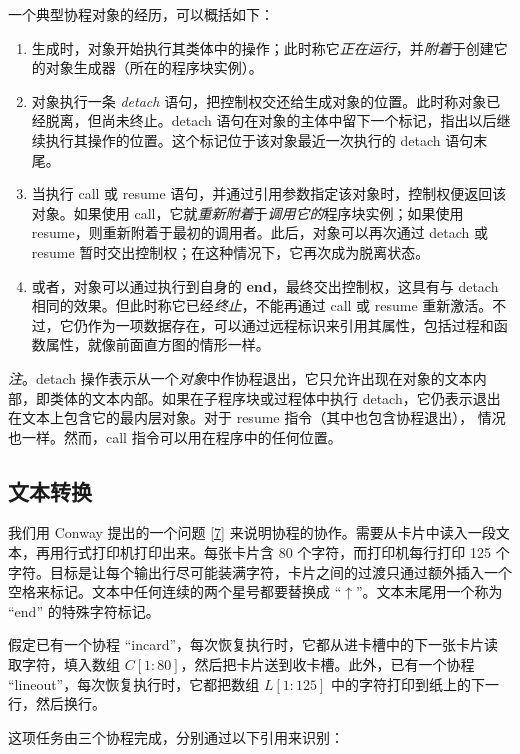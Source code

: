 \documentclass[twoside,11pt,fontset=none]{ctexbook}
\begin{document}
一个典型协程对象的经历，可以概括如下：

\begin{enumerate}[wide, nosep, label=(\arabic*)]
	\item 生成时，对象开始执行其类体中的操作；此时称它\textit{正在运行}，并\textit{附着}于创建它的对象生成器（所在的程序块实例）。
	\item 对象执行一条 \textit{detach} 语句，把控制权交还给生成对象的位置。此时称对象已经脱离，但尚未终止。detach 语句在对象的主体中留下一个标记，指出以后继续执行其操作的位置。这个标记位于该对象最近一次执行的 detach 语句末尾。
	\item 当执行 call 或 resume 语句，并通过引用参数指定该对象时，控制权便返回该对象。如果使用 call，它就\textit{重新附着}于\textit{调用它的}程序块实例；如果使用 resume，则重新附着于最初的调用者。此后，对象可以再次通过 detach 或 resume 暂时交出控制权；在这种情况下，它再次成为脱离状态。
	\item 或者，对象可以通过执行到自身的 \textbf{end}，最终交出控制权，这具有与 detach 相同的效果。但此时称它已经\textit{终止}，不能再通过 call 或 resume 重新激活。不过，它仍作为一项数据存在，可以通过远程标识来引用其属性，包括过程和函数属性，就像前面直方图的情形一样。
\end{enumerate}

\textit{注}。detach 操作表示从一个\textit{对象}中作协程退出，它只允许出现在对象的文本内部，即类体的文本内部。如果在子程序块或过程体中执行 detach，它仍表示退出在文本上包含它的最内层对象。对于 resume 指令（其中也包含协程退出），
情况也一样。然而，call 指令可以用在程序中的任何位置。

\subsection{文本转换}

我们用 Conway 提出的一个问题 [\hyperref[ref:7]{7}] 来说明协程的协作。需要从卡片中读入一段文本，再用行式打印机打印出来。每张卡片含 80 个字符，而打印机每行打印 125 个字符。目标是让每个输出行尽可能装满字符，卡片之间的过渡只通过额外插入一个空格来标记。文本中任何连续的两个星号都要替换成 ``$\uparrow$''。文本末尾用一个称为 ``end'' 的特殊字符标记。

假定已有一个协程 ``incard''，每次恢复执行时，它都从进卡槽中的下一张卡片读取字符，填入数组 $C[1 : 80]$，然后把卡片送到收卡槽。此外，已有一个协程 ``lineout''，每次恢复执行时，它都把数组 $L[1 : 125]$ 中的字符打印到纸上的下一行，然后换行。

这项任务由三个协程完成，分别通过以下引用来识别：
\end{document}
